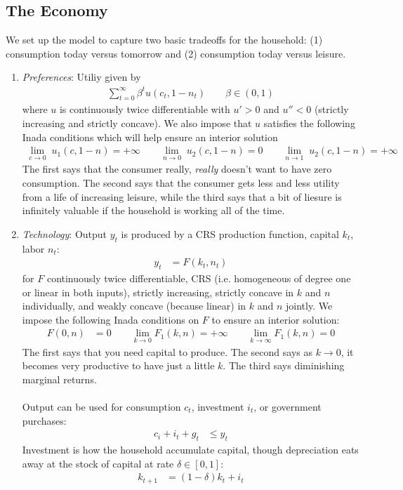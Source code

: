 \documentclass[12pt]{article}
\theoremstyle{plain}
\theoremstyle{definition}
\theoremstyle{remark}
\newcommand{\ra}{\rightarrow}
\newcommand{\sumtinfz}{\sum^\infty_{t=0}}
\begin{document}
\subsection{The Economy}
We set up the model to capture two basic tradeoffs for the household:
(1) consumption today versus tomorrow and (2) consumption today versus
leisure.
\begin{enumerate}
  \item \emph{Preferences}:
    Utiliy given by
    \begin{align*}
      \sumtinfz \beta^t u(c_t,1-n_t)
      \qquad\beta\in(0,1)
    \end{align*}
    where $u$ is continuously twice differentiable with $u'>0$ and
    $u''<0$ (strictly increasing and strictly concave).  We also impose
    that $u$ satisfies the following Inada conditions which will help
    ensure an interior solution
    \begin{align*}
      \lim_{c\ra 0} \; u_1(c,1-n) = +\infty
      \qquad
      \lim_{n\ra 0} \; u_2(c,1-n) = 0
      \qquad
      \lim_{n\ra 1} \; u_2(c,1-n) = +\infty
    \end{align*}
    The first says that the consumer really, \emph{really} doesn't want
    to have zero consumption. The second says that the consumer gets
    less and less utility from a life of increasing leisure, while the
    third says that a bit of liesure is infinitely valuable if the
    household is working all of the time.

  \item \emph{Technology}:
    Output $y_t$ is produced by a CRS production function, capital
    $k_t$, labor $n_t$:
    \begin{align*}
      y_t &= F(k_t,n_t)
    \end{align*}
    for $F$ continuously twice differentiable, CRS (i.e. homogeneous of
    degree one or linear in both inputs), strictly increasing, strictly
    concave in $k$ and $n$ individually, and weakly concave (because
    linear) in $k$ and $n$ jointly. We impose the following Inada
    conditions on $F$ to ensure an interior solution:
    \begin{align*}
      F(0,n) &= 0
      \qquad
      \lim_{k\ra 0} F_1(k,n) = +\infty
      \qquad
      \lim_{k\ra \infty} F_1(k,n) = 0
    \end{align*}
    The first says that you need capital to produce. The second says
    as $k\ra 0$, it becomes very productive to have just a little $k$.
    The third says diminishing marginal returns.
    \\
    \\
    Output can be used for consumption $c_t$, investment $i_t$, or
    government purchases:
    \begin{align*}
      c_i + i_t + g_t &\leq y_t
    \end{align*}
    Investment is how the household accumulate capital, though
    depreciation eats away at the stock of capital at rate
    $\delta\in[0,1]$:
    \begin{align*}
      k_{t+1} &= (1-\delta)k_t + i_t
    \end{align*}


\end{enumerate}
\end{document}
